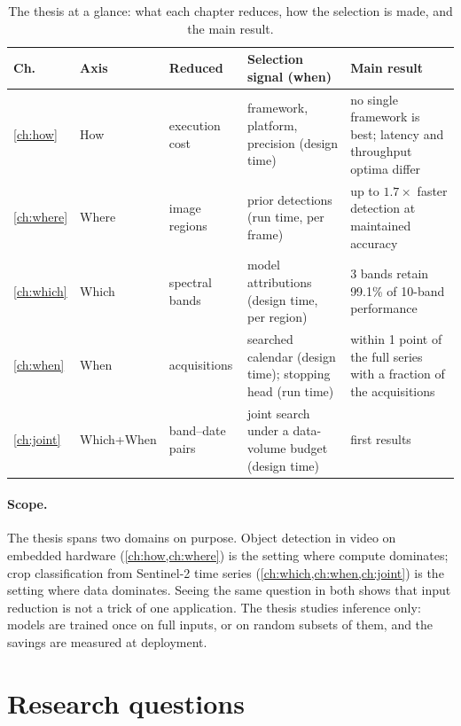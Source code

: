 \begin{table}[t]
  \centering
  \footnotesize
  \caption{The thesis at a glance: what each chapter reduces, how the selection
  is made, and the main result.}
  \label{tab:intro:glance}
  \begin{tabularx}{\textwidth}{@{}l l X X X@{}}
    \toprule
    Ch. & Axis & Reduced & Selection signal (when) & Main result \\
    \midrule
    \ref{ch:how}   & How       & execution cost      & framework, platform, precision (design time)
                   & no single framework is best; latency and throughput optima differ \\
    \ref{ch:where} & Where     & image regions       & prior detections (run time, per frame)
                   & up to $1.7\times$ faster detection at maintained accuracy \\
    \ref{ch:which} & Which     & spectral bands      & model attributions (design time, per region)
                   & 3 bands retain 99.1\% of 10-band performance \\
    \ref{ch:when}  & When      & acquisitions        & searched calendar (design time); stopping head (run time)
                   & within 1 point of the full series with a fraction of the acquisitions \\
    \ref{ch:joint} & Which+When & band--date pairs   & joint search under a data-volume budget (design time)
                   & first results \\
    \bottomrule
  \end{tabularx}
\end{table}

\paragraph{Scope.}
The thesis spans two domains on purpose. Object detection in video on embedded
hardware (\cref{ch:how,ch:where}) is the setting where compute dominates;
crop classification from Sentinel-2 time series (\cref{ch:which,ch:when,ch:joint})
is the setting where data dominates. Seeing the same question in both shows that
input reduction is not a trick of one application. The thesis studies inference
only: models are trained once on full inputs, or on random subsets of them, and
the savings are measured at deployment.

\section{Research questions}
\label{sec:intro:rq}

